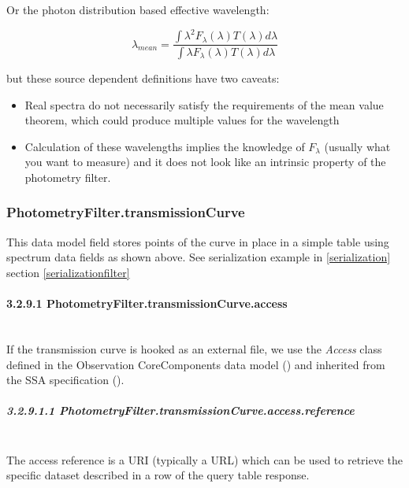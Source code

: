 \documentclass[11pt,a4paper]{ivoa}
\begin{document}
Or the photon distribution based effective wavelength:
\par
\[
\lambda_{mean} = \frac{\int \lambda^2 F_\lambda(\lambda)T(\lambda)d\lambda}{\int \lambda F_\lambda(\lambda)T(\lambda)d\lambda}
\]

but these source dependent definitions have two caveats:
\par

\begin{itemize}
	\item Real spectra do not necessarily satisfy the requirements of the mean value theorem, which could produce multiple values for the wavelength

	\item Calculation of these wavelengths implies the knowledge of $F_\lambda $ (usually what you want to measure) and it does not look like an intrinsic property of the photometry filter.
\end{itemize}\par

\subsubsection{PhotometryFilter.transmissionCurve}
This data model field stores points of the curve in place in a simple table using spectrum data fields as shown above. See serialization example in \ref{serialization} section \ref{serializationfilter} \par

\paragraph{3.2.9.1 PhotometryFilter.transmissionCurve.access} \hspace{0pt} \\
If the transmission curve is hooked as an external file, we use the \textit{Access} class defined in the Observation CoreComponents data model (\cite{louys2011ivoa}) and inherited from the SSA specification (\cite{2012ivoatody}).
\par

\subparagraph{3.2.9.1.1 PhotometryFilter.transmissionCurve.access.reference} \hspace{0pt} \\
The access reference is a URI (typically a URL) which can be used to retrieve the specific dataset described in a row of the query table response. \par
\end{document}
